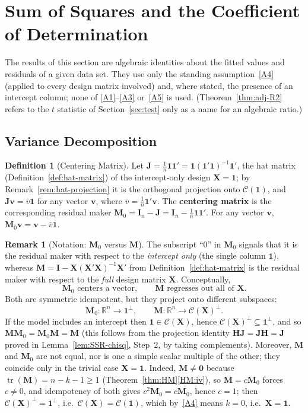 \documentclass[12pt,a4paper]{article}
\theoremstyle{definition}
\newtheorem{definition}[theorem]{Definition}
\newtheorem{remark}[theorem]{Remark}
\DeclareMathOperator\tr{tr}
\newcommand{\bX}{\mathbf{X}}
\newcommand{\bI}{\mathbf{I}}
\newcommand{\bH}{\mathbf{H}}
\newcommand{\bM}{\mathbf{M}}
\newcommand{\bone}{\mathbf{1}}
\newcommand{\bzero}{\mathbf{0}}
\newcommand{\bv}{\mathbf{v}}
\newcommand{\Real}{\mathbb{R}}
\newcommand{\calC}{\mathcal{C}}
\newcommand{\bJ}{\mathbf{J}}
\begin{document}
\section{Sum of Squares and the Coefficient of Determination}\label{sec:R2}

The results of this section are algebraic identities about the fitted values and residuals of a given data set. They use only the standing assumption~\ref{A4} (applied to every design matrix involved) and, where stated, the presence of an intercept column; none of \ref{A1}--\ref{A3} or~\ref{A5} is used. (Theorem~\ref{thm:adj-R2} refers to the $t$ statistic of Section~\ref{sec:test} only as a name for an algebraic ratio.)

\subsection{Variance Decomposition}

\begin{definition}[Centering Matrix]\label{def:centering}
Let $\bJ = \frac{1}{n}\bone\bone' = \bone(\bone'\bone)^{-1}\bone'$, the hat matrix (Definition~\ref{def:hat-matrix}) of the intercept-only design $\bX = \bone$; by Remark~\ref{rem:hat-projection} it is the orthogonal projection onto $\calC(\bone)$, and $\bJ\bv = \bar{v}\bone$ for any vector $\bv$, where $\bar{v} = \frac{1}{n}\bone'\bv$. The \textbf{centering matrix} is the corresponding residual maker $\bM_0 = \bI_n - \bJ = \bI_n - \frac{1}{n}\bone\bone'$. For any vector $\bv$, $\bM_0\bv = \bv - \bar{v}\bone$.
\end{definition}

\begin{remark}[Notation: $\bM_0$ versus $\bM$]\label{rem:M0-vs-M}
The subscript ``$0$'' in $\bM_0$ signals that it is the residual maker with respect to the \emph{intercept only} (the single column $\bone$), whereas $\bM = \bI - \bX(\bX'\bX)^{-1}\bX'$ from Definition~\ref{def:hat-matrix} is the residual maker with respect to the \emph{full} design matrix $\bX$. Conceptually,
\[
\bM_0 \text{ centers a vector},\qquad \bM \text{ regresses out all of } \bX.
\]
Both are symmetric idempotent, but they project onto different subspaces:
\[
\bM_0 : \Real^n \to \bone^{\perp},\qquad \bM : \Real^n \to \calC(\bX)^{\perp}.
\]
If the model includes an intercept then $\bone \in \calC(\bX)$, hence $\calC(\bX)^\perp \subseteq \bone^\perp$, and so $\bM\bM_0 = \bM_0\bM = \bM$ (this follows from the projection identity $\bH\bJ = \bJ\bH = \bJ$ proved in Lemma~\ref{lem:SSR-chisq}, Step~2, by taking complements). Moreover, $\bM$ and $\bM_0$ are not equal, nor is one a simple scalar multiple of the other; they coincide only in the trivial case $\bX = \bone$. Indeed, $\bM \neq \bzero$ because $\tr(\bM) = n - k - 1 \geqslant 1$ (Theorem~\ref{thm:HM}\ref{HM:iv}), so $\bM = c\bM_0$ forces $c \neq 0$, and idempotency of both gives $c^2\bM_0 = c\bM_0$, hence $c = 1$; then $\calC(\bX)^\perp = \bone^\perp$, i.e.\ $\calC(\bX) = \calC(\bone)$, which by~\ref{A4} means $k = 0$, i.e.\ $\bX = \bone$.
\end{remark}
\end{document}
